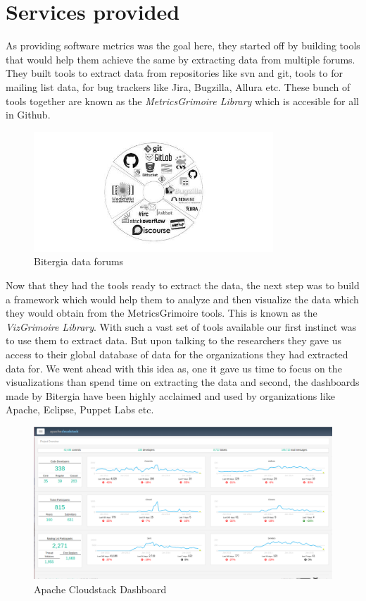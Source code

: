 \documentclass[seploa]{beavtex}
\begin{document}
\section{Services provided}
As providing software metrics was the goal here, they started off by building tools that would help them achieve the same by extracting data from multiple forums. They built tools to extract data from repositories like svn and git, tools to for mailing list data, for bug trackers like Jira, Bugzilla, Allura etc. These bunch of tools together are known as the \emph{MetricsGrimoire Library} which is accesible for all in Github.

\begin{figure}[!ht]
\centering
\includegraphics[width=90mm]{bitergia.jpg}
\caption{Bitergia data forums}
\end{figure}

Now that they had the tools ready to extract the data, the next step was to build a framework which would help them to analyze and then visualize the data which they would obtain from the MetricsGrimoire tools. This is known as the \emph{VizGrimoire Library}. With such a vast set of tools available our first instinct was to use them to extract data. But upon talking to the researchers they gave us access to their global database of data for the organizations they had extracted data for. We went ahead with this idea as, one it gave us time to focus on the visualizations than spend time on extracting the data and second, the dashboards made by Bitergia have been highly acclaimed and used by organizations like Apache, Eclipse, Puppet Labs etc.

\begin{figure}[H]
\centering
\includegraphics[width=120mm]{apache.png}
\caption{Apache Cloudstack Dashboard}
\end{figure}
\end{document}
